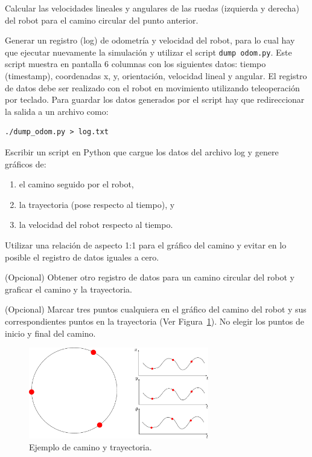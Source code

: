 \documentclass[tp]{lcc}
\begin{document}
\ejercicio  Calcular las velocidades lineales y angulares de las ruedas (izquierda y derecha) del robot para el camino circular del punto anterior.

\ejercicio Generar un registro (log) de odometría y velocidad del robot, para lo cual hay que ejecutar nuevamente la simulación y utilizar el script \lstinline[style=bash]{dump odom.py}. Este script muestra en pantalla 6 columnas con los siguientes datos: tiempo (timestamp), coordenadas x, y, orientación, velocidad lineal y angular. El registro de datos debe ser realizado con el robot en movimiento utilizando teleoperación por teclado. Para guardar los datos generados por el script hay que redireccionar la salida a un archivo como:

\begin{lstlisting}[style=bash] 
./dump_odom.py > log.txt
\end{lstlisting}

\ejercicio Escribir un script en Python que cargue los datos del archivo log y genere gráficos de:
\begin{enumerate}
	\item el camino seguido por el robot,
	\item la trayectoria (pose respecto al tiempo), y
	\item la velocidad del robot respecto al tiempo.
\end{enumerate} 

\begin{nota}
	Utilizar una relación de aspecto 1:1 para el gráfico del camino y evitar en lo posible el registro de datos iguales a cero.
\end{nota}

\ejercicio (Opcional) Obtener otro registro de datos para un camino circular del robot y graficar el camino y la trayectoria.

\ejercicio (Opcional) Marcar tres puntos cualquiera en el gráfico del camino del robot y sus correspondientes puntos en la trayectoria (Ver Figura~\ref{fig:trajectory_example}). No elegir los puntos de inicio y final del camino.

\begin{figure}[!htbp]
    \centering
    \includegraphics[width=0.7\textwidth]{./images/trajectory_example.pdf}
    \caption{Ejemplo de camino y trayectoria.}
    \label{fig:trajectory_example}
\end{figure}
\end{document}
